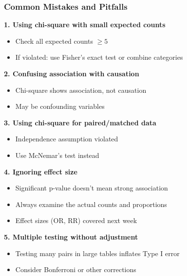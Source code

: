 \documentclass{beamer}
\begin{document}
\begin{frame}
\frametitle{Common Mistakes and Pitfalls}
\textbf{1. Using chi-square with small expected counts}
\begin{itemize}\setlength\itemsep{-0.2em}
\item Check all expected counts $\geq 5$
\item If violated: use Fisher's exact test or combine categories
\end{itemize}

\vspace{0.2cm}
\textbf{2. Confusing association with causation}
\begin{itemize}\setlength\itemsep{-0.2em}
\item Chi-square shows association, not causation
\item May be confounding variables
\end{itemize}

\vspace{0.2cm}
\textbf{3. Using chi-square for paired/matched data}
\begin{itemize}\setlength\itemsep{-0.2em}
\item Independence assumption violated
\item Use McNemar's test instead
\end{itemize}

\vspace{0.2cm}
\textbf{4. Ignoring effect size}
\begin{itemize}\setlength\itemsep{-0.2em}
\item Significant p-value doesn't mean strong association
\item Always examine the actual counts and proportions
\item Effect sizes (OR, RR) covered next week
\end{itemize}

\vspace{0.2cm}
\textbf{5. Multiple testing without adjustment}
\begin{itemize}\setlength\itemsep{-0.2em}
\item Testing many pairs in large tables inflates Type I error
\item Consider Bonferroni or other corrections
\end{itemize}
\end{frame}
\end{document}
